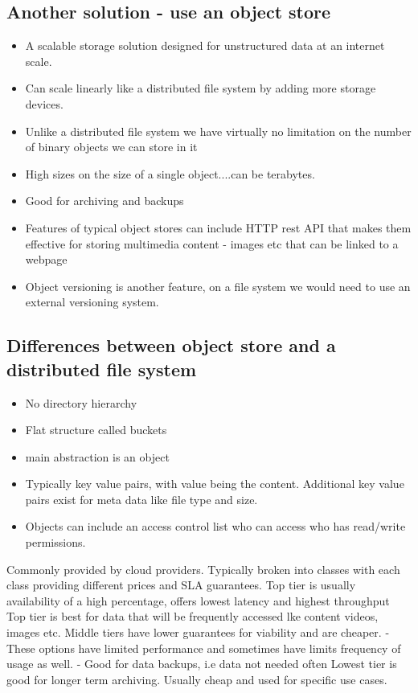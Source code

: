 \subsection{Another solution - use an object store}
\begin{itemize}
    \item A scalable storage solution designed for unstructured data at an internet scale.
    \item Can scale linearly like a distributed file system by adding more storage devices.
    \item Unlike a distributed file system we have virtually no limitation on the number of binary objects we can store in it
    \item High sizes on the size of a single object....can be terabytes.
    \item Good for archiving and backups
    \item Features of typical object stores can include HTTP rest API that makes them effective for storing multimedia content - images etc that can be linked to a webpage
    \item Object versioning is another feature, on a file system we would need to use an external versioning system.
\end{itemize}

\subsection{Differences between object store and a distributed file system}
\begin{itemize}
    \item No directory hierarchy
    \item Flat structure called buckets
    \item main abstraction is an object
    \item Typically key value pairs, with value being the content. Additional key value pairs exist for meta data like file type and size.
    \item Objects can include an access control list who can access who has read/write permissions.
\end{itemize}

Commonly provided by cloud providers.
Typically broken into classes with each class providing different prices and SLA guarantees.
Top tier is usually availability of a high percentage, offers lowest latency and highest throughput
Top tier is best for data that will be frequently accessed lke content videos, images etc.
Middle tiers have lower guarantees for viability and are cheaper.
- These options have limited performance and sometimes have limits frequency of usage as well.
- Good for data backups, i.e data not needed often
Lowest tier is good for longer term archiving.
Usually cheap and used for specific use cases.

